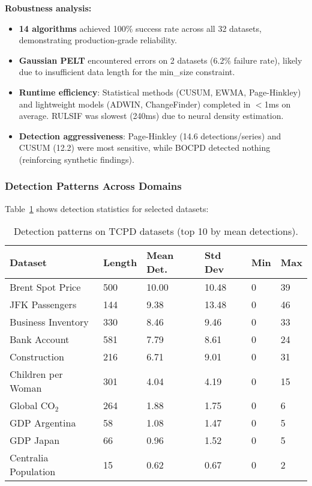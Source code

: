 \textbf{Robustness analysis:}
\begin{itemize}
    \item \textbf{14 algorithms} achieved 100\% success rate across all 32 datasets, demonstrating production-grade reliability.
    \item \textbf{Gaussian PELT} encountered errors on 2 datasets (6.2\% failure rate), likely due to insufficient data length for the min\_size constraint.
    \item \textbf{Runtime efficiency}: Statistical methods (CUSUM, EWMA, Page-Hinkley) and lightweight models (ADWIN, ChangeFinder) completed in $<$1ms on average. RULSIF was slowest (240ms) due to neural density estimation.
    \item \textbf{Detection aggressiveness}: Page-Hinkley (14.6 detections/series) and CUSUM (12.2) were most sensitive, while BOCPD detected nothing (reinforcing synthetic findings).
\end{itemize}

\subsubsection{Detection Patterns Across Domains}

Table~\ref{tab:tcpd_datasets} shows detection statistics for selected datasets:

\begin{table}[H]
\caption{Detection patterns on TCPD datasets (top 10 by mean detections).\label{tab:tcpd_datasets}}
\begin{tabularx}{\textwidth}{lXXXXX}
\toprule
\textbf{Dataset} & \textbf{Length} & \textbf{Mean Det.} & \textbf{Std Dev} & \textbf{Min} & \textbf{Max} \\
\midrule
Brent Spot Price & 500 & 10.00 & 10.48 & 0 & 39 \\
JFK Passengers & 144 & 9.38 & 13.48 & 0 & 46 \\
Business Inventory & 330 & 8.46 & 9.46 & 0 & 33 \\
Bank Account & 581 & 7.79 & 8.61 & 0 & 24 \\
Construction & 216 & 6.71 & 9.01 & 0 & 31 \\
Children per Woman & 301 & 4.04 & 4.19 & 0 & 15 \\
Global CO$_2$ & 264 & 1.88 & 1.75 & 0 & 6 \\
GDP Argentina & 58 & 1.08 & 1.47 & 0 & 5 \\
GDP Japan & 66 & 0.96 & 1.52 & 0 & 5 \\
Centralia Population & 15 & 0.62 & 0.67 & 0 & 2 \\
\bottomrule
\end{tabularx}
\end{table}

